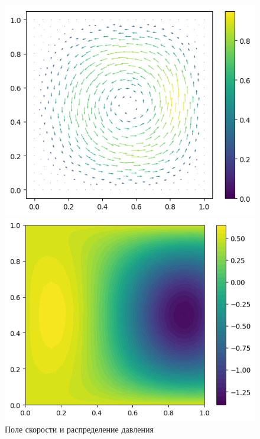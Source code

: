 \documentclass[a4paper,10pt]{report}
\begin{document}
\begin{figure}[H]
    \begin{minipage}{0.49\linewidth}
        \includegraphics[height=0.75\linewidth]{shiftedvortex/u.png}
    \end{minipage}
    \begin{minipage}{0.49\linewidth}
        \includegraphics[height=0.75\linewidth]{shiftedvortex/p.png}
    \end{minipage}
    \label{fig:shiftedvortex}
    \caption{Поле скорости и распределение давления}
\end{figure}
    
\end{document}
